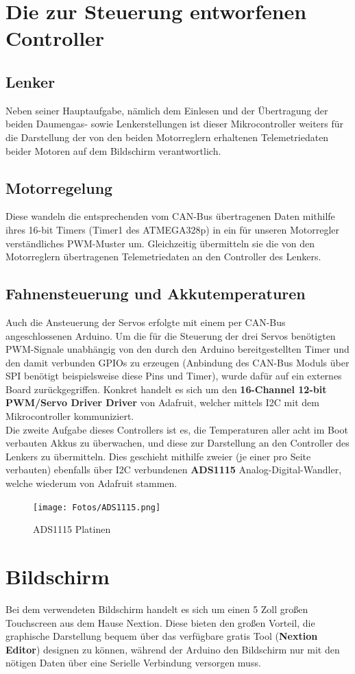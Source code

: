 \section{Die zur Steuerung entworfenen Controller}
\subsection{Lenker}
Neben seiner Hauptaufgabe, nämlich dem Einlesen und der Übertragung der beiden Daumengas- sowie Lenkerstellungen ist dieser Mikrocontroller weiters für die Darstellung der von den beiden Motorreglern erhaltenen Telemetriedaten beider Motoren auf dem Bildschirm verantwortlich.
\subsection{Motorregelung}
Diese wandeln die entsprechenden vom CAN-Bus übertragenen Daten mithilfe ihres 16-bit Timers (Timer1 des ATMEGA328p) in ein für unseren Motorregler verständliches PWM-Muster um.
Gleichzeitig übermitteln sie die von den Motorreglern übertragenen Telemetriedaten an den Controller des Lenkers.
\subsection{Fahnensteuerung und Akkutemperaturen}
Auch die Ansteuerung der Servos erfolgte mit einem per CAN-Bus angeschlossenen Arduino. Um die für die Steuerung der drei Servos benötigten PWM-Signale unabhängig von den durch den Arduino bereitgestellten Timer und den damit verbunden GPIOs zu erzeugen 
(Anbindung des CAN-Bus Moduls über SPI benötigt beispielsweise diese Pins und Timer), wurde dafür auf ein externes Board zurückgegriffen.
Konkret handelt es sich um den \textbf{16-Channel 12-bit PWM/Servo Driver Driver} von Adafruit, welcher mittels I2C mit dem Mikrocontroller kommuniziert.\\

Die zweite Aufgabe dieses Controllers ist es, die Temperaturen aller acht im Boot verbauten Akkus zu überwachen, und diese zur Darstellung an den Controller des Lenkers zu übermitteln.
Dies geschieht mithilfe zweier (je einer pro Seite verbauten) ebenfalls über I2C verbundenen \textbf{ADS1115} Analog-Digital-Wandler, welche wiederum von Adafruit stammen.  

\begin{figure}[h]
    \texttt{[image: Fotos/ADS1115.png]}
    \caption{ADS1115 Platinen}    
\end{figure}
\newpage
\section{Bildschirm}
Bei dem verwendeten Bildschirm handelt es sich um einen 5 Zoll großen Touchscreen aus dem Hause Nextion.
Diese bieten den großen Vorteil, die graphische Darstellung bequem über das verfügbare gratis Tool (\textbf{Nextion Editor}) designen zu können, während der Arduino den Bildschirm nur mit den nötigen Daten über eine Serielle Verbindung versorgen muss. 
